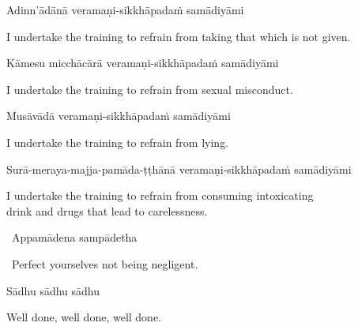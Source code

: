Adinn'ādānā veramaṇi-sikkhāpadaṁ samādiyāmi

\begin{english-hang}
  I undertake the training to refrain from taking that which is not given.
\end{english-hang}

Kāmesu micchācārā veramaṇi-sikkhāpadaṁ samādiyāmi

\begin{english}
  I undertake the training to refrain from sexual misconduct.
\end{english}

Musāvādā veramaṇi-sikkhāpadaṁ samādiyāmi

\begin{english}
  I undertake the training to refrain from lying.
\end{english}

\begin{pali-hang}
  Surā-meraya-majja-pamāda-ṭṭhānā veramaṇi-sikkhāpadaṁ samādiyāmi
\end{pali-hang}

\begin{english-hang}
  I undertake the training to refrain from consuming intoxicating\ifninebythirteenversion \else \\ \fi
  drink and drugs that lead to carelessness.\ifdigitalversion\makeatletter\hyperlink{endnote140-appendix}\makeatother\fi
\end{english-hang}

\begin{leader}
  \anglebracketleft\ \hspace{-0.5mm}Appamādena sampādetha \hspace{-0.5mm}\anglebracketright\
\end{leader}
\begin{leader-english-below-pali}
  \anglebracketleft\ \hspace{-0.5mm}Perfect yourselves not being negligent. \hspace{-0.5mm}\anglebracketright\
\end{leader-english-below-pali}

Sādhu sādhu sādhu

\begin{english}
  Well done, well done, well done.
\end{english}


